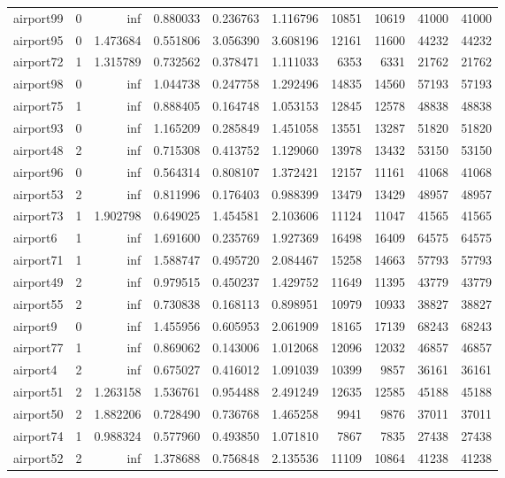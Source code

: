 \begin{longtable}{|l|r|r|r|r|r|r|r|r|r|}
airport99 & 0 & inf & 0.880033 & 0.236763 & 1.116796 & 10851 & 10619 & 41000 & 41000 \\
airport95 & 0 & 1.473684 & 0.551806 & 3.056390 & 3.608196 & 12161 & 11600 & 44232 & 44232 \\
airport72 & 1 & 1.315789 & 0.732562 & 0.378471 & 1.111033 & 6353 & 6331 & 21762 & 21762 \\
airport98 & 0 & inf & 1.044738 & 0.247758 & 1.292496 & 14835 & 14560 & 57193 & 57193 \\
airport75 & 1 & inf & 0.888405 & 0.164748 & 1.053153 & 12845 & 12578 & 48838 & 48838 \\
airport93 & 0 & inf & 1.165209 & 0.285849 & 1.451058 & 13551 & 13287 & 51820 & 51820 \\
airport48 & 2 & inf & 0.715308 & 0.413752 & 1.129060 & 13978 & 13432 & 53150 & 53150 \\
airport96 & 0 & inf & 0.564314 & 0.808107 & 1.372421 & 12157 & 11161 & 41068 & 41068 \\
airport53 & 2 & inf & 0.811996 & 0.176403 & 0.988399 & 13479 & 13429 & 48957 & 48957 \\
airport73 & 1 & 1.902798 & 0.649025 & 1.454581 & 2.103606 & 11124 & 11047 & 41565 & 41565 \\
airport6 & 1 & inf & 1.691600 & 0.235769 & 1.927369 & 16498 & 16409 & 64575 & 64575 \\
airport71 & 1 & inf & 1.588747 & 0.495720 & 2.084467 & 15258 & 14663 & 57793 & 57793 \\
airport49 & 2 & inf & 0.979515 & 0.450237 & 1.429752 & 11649 & 11395 & 43779 & 43779 \\
airport55 & 2 & inf & 0.730838 & 0.168113 & 0.898951 & 10979 & 10933 & 38827 & 38827 \\
airport9 & 0 & inf & 1.455956 & 0.605953 & 2.061909 & 18165 & 17139 & 68243 & 68243 \\
airport77 & 1 & inf & 0.869062 & 0.143006 & 1.012068 & 12096 & 12032 & 46857 & 46857 \\
airport4 & 2 & inf & 0.675027 & 0.416012 & 1.091039 & 10399 & 9857 & 36161 & 36161 \\
airport51 & 2 & 1.263158 & 1.536761 & 0.954488 & 2.491249 & 12635 & 12585 & 45188 & 45188 \\
airport50 & 2 & 1.882206 & 0.728490 & 0.736768 & 1.465258 & 9941 & 9876 & 37011 & 37011 \\
airport74 & 1 & 0.988324 & 0.577960 & 0.493850 & 1.071810 & 7867 & 7835 & 27438 & 27438 \\
airport52 & 2 & inf & 1.378688 & 0.756848 & 2.135536 & 11109 & 10864 & 41238 & 41238 \\

\end{longtable}
